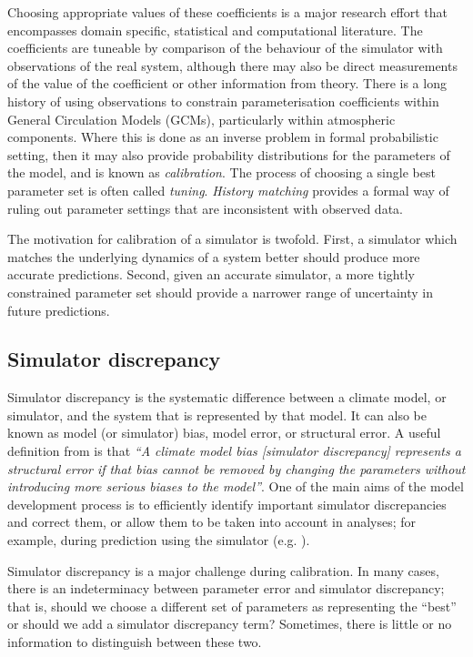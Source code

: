 \documentclass[esd, manuscript]{copernicus}
\begin{document}
Choosing appropriate values of these coefficients is a major research effort that encompasses domain specific, statistical and computational literature. The coefficients are tuneable by comparison of the behaviour of the simulator with observations of the real system, although there may also be direct measurements of the value of the coefficient or other information from theory. There is a long history of using observations to constrain parameterisation coefficients within General Circulation Models (GCMs), particularly within atmospheric components. Where this is done as an inverse problem in formal probabilistic setting, then it may also provide probability distributions for the parameters of the model, and is known as \emph{calibration}. The process of choosing a single best parameter set is often called \emph{tuning}. \emph{History matching} provides a formal way of ruling out parameter settings that are inconsistent with observed data. 

The motivation for calibration of a simulator is twofold. First, a simulator which matches the underlying dynamics of a system better should produce more accurate predictions. Second, given an accurate simulator, a more tightly constrained parameter set should provide a narrower range of uncertainty in future predictions. 

\subsection{Simulator discrepancy}

Simulator discrepancy is the systematic difference between a climate model, or simulator, and the system that is represented by that model. It can also be known as model (or simulator) bias, model error, or structural error. A useful definition from \cite{williamson2014identifying} is that \emph{``A climate model bias [simulator discrepancy] represents a structural error if that bias cannot be removed by changing the parameters without introducing more serious biases to the model''}. One of the main aims of the model development process is to efficiently identify important simulator discrepancies and correct them, or allow them to be taken into account in analyses; for example, during prediction using the simulator (e.g. \cite{sexton2011multivariate}).

Simulator discrepancy is a major challenge during calibration. In many cases, there is an indeterminacy between parameter error and simulator discrepancy; that is, should we choose a different set of parameters as representing the ``best'' or should we add a simulator discrepancy term? Sometimes, there is little or no information to distinguish between these two.
\end{document}
